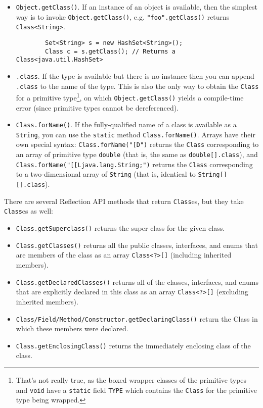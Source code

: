 \documentclass[8pt, table, xcdraw]{article}%
\begin{document}
\begin{itemize}
    \item \lstinline{Object.getClass()}. If an instance of an object is available, then the simplest way is to invoke \lstinline{Object.getClass()}, e.g. \lstinline{"foo".getClass()} returns \lstinline{Class<String>}.
    \begin{lstlisting}
        Set<String> s = new HashSet<String>();
        Class c = s.getClass(); // Returns a Class<java.util.HashSet>
    \end{lstlisting}

    \item \lstinline{.class}. If the type is available but there is no instance then you can append \lstinline{.class} to the name of the type. This is also the only way to obtain the \lstinline{Class} for a primitive type\footnote{That's not really true, as the boxed wrapper classes of the primitive types and \lstinline{void} have a \lstinline{static} field \lstinline{TYPE} which contains the \lstinline{Class} for the primitive type being wrapped.}, on which \lstinline{Object.getClass()} yields a compile-time error (since primitive types cannot be dereferenced).

    \item \lstinline{Class.forName()}. If the fully-qualified name of a class is available as a \lstinline{String}, you can use the \lstinline{static} method \lstinline{Class.forName()}. Arrays have their own special syntax: \lstinline{Class.forName("[D")} returns the \lstinline{Class} corresponding to an array of primitive type \lstinline{double} (that is, the same as \lstinline{double[].class}), and \lstinline{Class.forName("[[Ljava.lang.String;")} returns the \lstinline{Class} corresponding to a two-dimensional array of \lstinline{String} (that is, identical to \lstinline{String[][].class}).
\end{itemize}

There are several Reflection API methods that return \lstinline{Class}es, but they take \lstinline{Class}es as well:

\begin{itemize}
    \item \lstinline{Class.getSuperclass()} returns the super class for the given class.
    \item  \lstinline{Class.getClasses()} returns all the public classes, interfaces, and enums that are members of the class as an array \lstinline{Class<?>[]} (including inherited members).
    \item \lstinline{Class.getDeclaredClasses()} returns all of the classes, interfaces, and enums that are explicitly declared in this class as an array \lstinline{Class<?>[]} (excluding inherited members).
    \item \lstinline{Class/Field/Method/Constructor.getDeclaringClass()} return the Class in which these members were declared.
    \item \lstinline{Class.getEnclosingClass()} returns the immediately enclosing class of the class.
\end{itemize}
\end{document}
